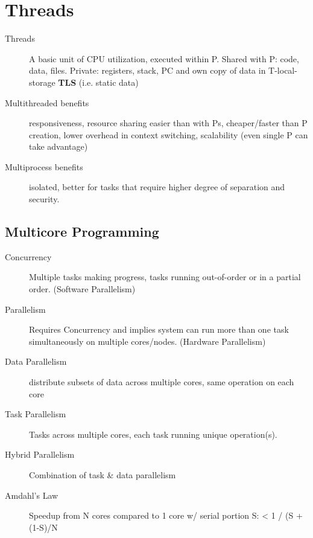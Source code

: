 \section*{Threads}
\begin{description}
  \item[Threads] A basic unit of CPU utilization, executed within P.  Shared with P: code, data, files. Private: registers, stack, PC and own copy of data in T-local-storage \textbf{TLS} (i.e. static data) %
  \item[Multithreaded benefits] responsiveness, resource sharing easier than with Ps, cheaper/faster than P creation, lower overhead in context switching, scalability (even single P can take advantage)
  \item[Multiprocess benefits] isolated, better for tasks that require higher degree of separation and security.
\end{description}

\subsection*{Multicore Programming}
\begin{description}
  \item[Concurrency] Multiple tasks making progress, tasks running out-of-order or in a partial order. (Software Parallelism)
  \item[Parallelism] Requires Concurrency and implies system can run more than one task simultaneously on multiple cores/nodes. (Hardware Parallelism)
  \item[Data Parallelism] distribute subsets of data across multiple cores, same operation on each core
  \item[Task Parallelism]  Tasks across  multiple cores, each task running unique operation(s).
  \item[Hybrid Parallelism] Combination of task \& data parallelism
  \item[Amdahl's Law] Speedup from N cores compared to 1 core w/ serial portion S: < 1 / (S + (1-S)/N
\end{description}

